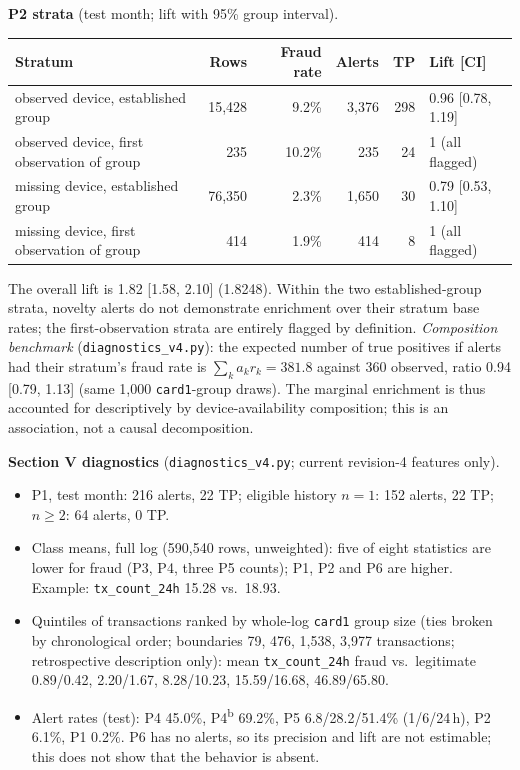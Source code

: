 \documentclass[10pt]{article}
\newcommand{\tf}[1]{\texttt{#1}}
\begin{document}
\textbf{P2 strata} (test month; lift with 95\% group interval).
\begin{center}\footnotesize
\begin{tabular}{@{}lrrrrl@{}}
\toprule
Stratum & Rows & Fraud rate & Alerts & TP & Lift [CI] \\
\midrule
observed device, established group & 15,428 & 9.2\% & 3,376 & 298 & 0.96 [0.78, 1.19] \\
observed device, first observation of group & 235 & 10.2\% & 235 & 24 & 1 (all flagged) \\
missing device, established group & 76,350 & 2.3\% & 1,650 & 30 & 0.79 [0.53, 1.10] \\
missing device, first observation of group & 414 & 1.9\% & 414 & 8 & 1 (all flagged) \\
\bottomrule
\end{tabular}\end{center}
The overall lift is 1.82 [1.58, 2.10] (1.8248). Within the two established-group strata, novelty alerts do not demonstrate enrichment over their stratum base rates; the first-observation strata are entirely flagged by definition. \emph{Composition benchmark} (\tf{diagnostics\_v4.py}): the expected number of true positives if alerts had their stratum's fraud rate is $\sum_k a_k r_k=381.8$ against 360 observed, ratio 0.94 [0.79, 1.13] (same 1,000 \tf{card1}-group draws). The marginal enrichment is thus accounted for descriptively by device-availability composition; this is an association, not a causal decomposition.

\textbf{Section V diagnostics} (\tf{diagnostics\_v4.py}; current revision-4 features only).
\begin{itemize}\itemsep0pt
\item P1, test month: 216 alerts, 22 TP; eligible history $n=1$: 152 alerts, 22 TP; $n\ge2$: 64 alerts, 0 TP.
\item Class means, full log (590,540 rows, unweighted): five of eight statistics are lower for fraud (P3, P4, three P5 counts); P1, P2 and P6 are higher. Example: \tf{tx\_count\_24h} 15.28 vs.\ 18.93.
\item Quintiles of transactions ranked by whole-log \tf{card1} group size (ties broken by chronological order; boundaries 79, 476, 1,538, 3,977 transactions; retrospective description only): mean \tf{tx\_count\_24h} fraud vs.\ legitimate 0.89/0.42, 2.20/1.67, 8.28/10.23, 15.59/16.68, 46.89/65.80.
\item Alert rates (test): P4 45.0\%, P4\textsuperscript{b} 69.2\%, P5 6.8/28.2/51.4\% (1/6/24\,h), P2 6.1\%, P1 0.2\%. P6 has no alerts, so its precision and lift are not estimable; this does not show that the behavior is absent.
\end{itemize}
\end{document}
